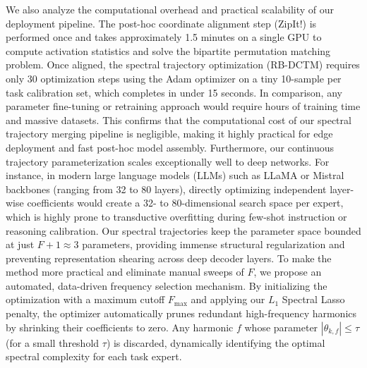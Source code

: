 We also analyze the computational overhead and practical scalability of our deployment pipeline. The post-hoc coordinate alignment step (ZipIt!) is performed once and takes approximately 1.5 minutes on a single GPU to compute activation statistics and solve the bipartite permutation matching problem. Once aligned, the spectral trajectory optimization (RB-DCTM) requires only 30 optimization steps using the Adam optimizer on a tiny 10-sample per task calibration set, which completes in under 15 seconds. In comparison, any parameter fine-tuning or retraining approach would require hours of training time and massive datasets. This confirms that the computational cost of our spectral trajectory merging pipeline is negligible, making it highly practical for edge deployment and fast post-hoc model assembly. Furthermore, our continuous trajectory parameterization scales exceptionally well to deep networks. For instance, in modern large language models (LLMs) such as LLaMA or Mistral backbones (ranging from 32 to 80 layers), directly optimizing independent layer-wise coefficients would create a 32- to 80-dimensional search space per expert, which is highly prone to transductive overfitting during few-shot instruction or reasoning calibration. Our spectral trajectories keep the parameter space bounded at just $F+1 \approx 3$ parameters, providing immense structural regularization and preventing representation shearing across deep decoder layers. To make the method more practical and eliminate manual sweeps of $F$, we propose an automated, data-driven frequency selection mechanism\label{sec:experiments_automated_selection}. By initializing the optimization with a maximum cutoff $F_{\max}$ and applying our $L_1$ Spectral Lasso penalty, the optimizer automatically prunes redundant high-frequency harmonics by shrinking their coefficients to zero. Any harmonic $f$ whose parameter $|\theta_{k,f}| \le \tau$ (for a small threshold $\tau$) is discarded, dynamically identifying the optimal spectral complexity for each task expert.

